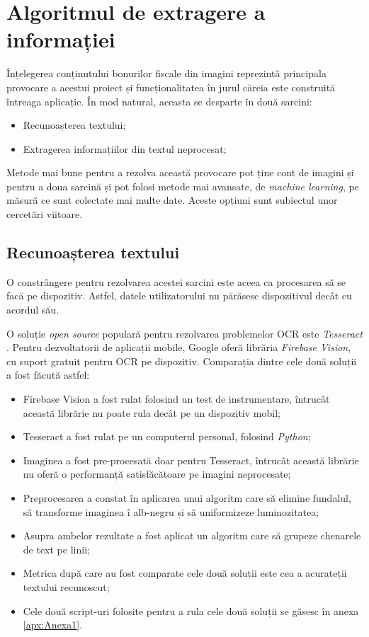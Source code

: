 \section{Algoritmul de extragere a informației}

Înțelegerea conținutului bonurilor fiscale din imagini reprezintă principala provocare a acestui proiect și funcționalitatea în jurul căreia este construită întreaga aplicație. În mod natural, aceasta se desparte în două sarcini:

\begin{itemize}
  \item 
  Recunoașterea textului;
  \item
  Extragerea informațiilor din textul neprocesat;
\end{itemize}

Metode mai bune pentru a rezolva această provocare pot ține cont de imagini și pentru a doua sarcină și pot folosi metode mai avansate, de \emph{machine learning}, pe măsură ce sunt colectate mai multe date. Aceste opțiuni sunt subiectul unor cercetări viitoare.

\subsection{Recunoașterea textului}

O constrângere pentru rezolvarea acestei sarcini este aceea ca procesarea să se facă pe dispozitiv. Astfel, datele utilizatorului nu părăsesc dispozitivul decât cu acordul său.

O soluție \emph{open source} populară pentru rezolvarea problemelor OCR este \emph{Tesseract} \cite{Tesseract}. Pentru dezvoltatorii de aplicații mobile, Google oferă librăria \emph{Firebase Vision}, cu suport gratuit pentru OCR pe dispozitiv. Comparația dintre cele două soluții a fost făcută astfel:

\begin{itemize}
  \item 
  Firebase Vision a fost rulat folosind un test de instrumentare, întrucât această librărie nu poate rula decât pe un dispozitiv mobil;
  \item
  Tesseract a fost rulat pe un computerul personal, folosind \emph{Python};
  \item
  Imaginea a fost pre-procesată doar pentru Tesseract, întrucât această librărie nu oferă o performanță satisfăcătoare pe imagini neprocesate;
  \item
  Preprocesarea a constat în aplicarea unui algoritm care să elimine fundalul, să transforme imaginea î alb-negru și să uniformizeze luminozitatea;
  \item
  Asupra ambelor rezultate a fost aplicat un algoritm care să grupeze chenarele de text pe linii;
  \item 
  Metrica după care au fost comparate cele două soluții este cea a acurateții textului recunoscut;
  \item 
  Cele două script-uri folosite pentru a rula cele două soluții se găsesc în anexa \ref{apx:Anexa1}.
\end{itemize}

